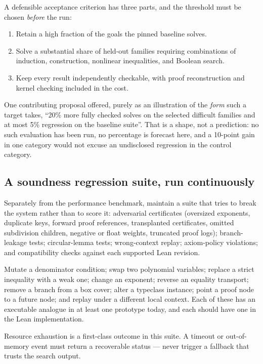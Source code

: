 A defensible acceptance criterion has three parts, and the threshold must be
chosen \emph{before} the run:

\begin{enumerate}[leftmargin=1.4em]
\item Retain a high fraction of the goals the pinned baseline solves.
\item Solve a substantial share of held-out families requiring combinations of
  induction, construction, nonlinear inequalities, and Boolean search.
\item Keep every result independently checkable, with proof reconstruction and
  kernel checking included in the cost.
\end{enumerate}

One contributing proposal offered, purely as an illustration of the \emph{form}
such a target takes, ``20\% more fully checked solves on the selected difficult
families and at most 5\% regression on the baseline suite''. That is a shape,
not a prediction: no such evaluation has been run, no percentage is forecast
here, and a 10-point gain in one category would not excuse an undisclosed
regression in the control category.

\subsection{A soundness regression suite, run continuously}

Separately from the performance benchmark, maintain a suite that tries to break
the system rather than to score it: adversarial certificates (oversized
exponents, duplicate keys, forward proof references, transplanted certificates,
omitted subdivision children, negative or float weights, truncated proof logs);
branch-leakage tests; circular-lemma tests; wrong-context replay; axiom-policy
violations; and compatibility checks against each supported Lean revision.

Mutate a denominator condition; swap two polynomial variables; replace a strict
inequality with a weak one; change an exponent; reverse an equality transport;
remove a branch from a box cover; alter a typeclass instance; point a proof node
to a future node; and replay under a different local context. Each of these has
an executable analogue in at least one prototype today, and each should have one
in the Lean implementation.

Resource exhaustion is a first-class outcome in this suite. A timeout or
out-of-memory event must return a recoverable status --- never trigger a
fallback that trusts the search output.
